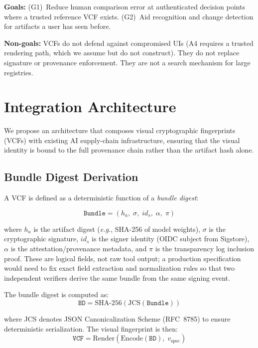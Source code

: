 \documentclass[conference,10pt]{IEEEtran}
\newcommand{\eg}{\textit{e.g.}}
\begin{document}
\smallskip\noindent\textbf{Goals:} (G1)~Reduce human comparison error at authenticated decision points where a trusted reference VCF exists. (G2)~Aid recognition and change detection for artifacts a user has seen before.

\smallskip\noindent\textbf{Non-goals:} VCFs do not defend against compromised UIs (A4 requires a trusted rendering path, which we assume but do not construct). They do not replace signature or provenance enforcement. They are not a search mechanism for large registries.

\section{Integration Architecture}
\label{sec:architecture}

We propose an architecture that composes visual cryptographic fingerprints (VCFs) with existing AI supply-chain infrastructure, ensuring that the visual identity is bound to the full provenance chain rather than the artifact hash alone.

\subsection{Bundle Digest Derivation}

A VCF is defined as a deterministic function of a \emph{bundle digest}:

\begin{equation}
\label{eq:bundle}
\texttt{Bundle} = (h_a,\; \sigma,\; \textit{id}_s,\; \alpha,\; \pi)
\end{equation}

\noindent where $h_a$ is the artifact digest (\eg, SHA-256 of model weights), $\sigma$ is the cryptographic signature, $\textit{id}_s$ is the signer identity (OIDC subject from Sigstore), $\alpha$ is the attestation/provenance metadata, and $\pi$ is the transparency log inclusion proof.
These are logical fields, not raw tool output; a production specification would need to fix exact field extraction and normalization rules so that two independent verifiers derive the same bundle from the same signing event.

The bundle digest is computed as:
\begin{equation}
\label{eq:bundledigest}
\texttt{BD} = \text{SHA-256}(\text{JCS}(\texttt{Bundle}))
\end{equation}

\noindent where JCS denotes JSON Canonicalization Scheme (RFC~8785) to ensure deterministic serialization.
The visual fingerprint is then:
\begin{equation}
\label{eq:vcf}
\texttt{VCF} = \text{Render}(\text{Encode}(\texttt{BD}),\; v_{\text{spec}})
\end{equation}
\end{document}

